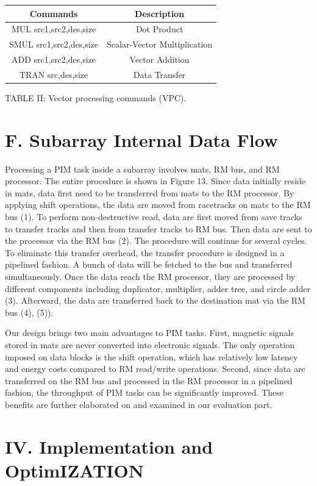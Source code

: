 \documentclass[10pt]{article}
\begin{document}
\begin{center}
\begin{tabular}{|c|c|}
\hline
Commands & Description \\
\hline
MUL src1,src2,des,size & Dot Product \\
\hline
SMUL src1,src2,des,size & Scalar-Vector Multiplication \\
\hline
ADD src1,src2,des,size & Vector Addition \\
\hline
TRAN src,des,size & Data Transfer \\
\hline
\end{tabular}
\end{center}

TABLE II: Vector processing commands (VPC).

\section*{F. Subarray Internal Data Flow}
Processing a PIM task inside a subarray involves mats, RM bus, and RM processor. The entire procedure is shown in Figure 13. Since data initially reside in mats, data first need to be transferred from mats to the RM processor. By applying shift operations, the data are moved from racetracks on mats to the RM bus (1). To perform non-destructive read, data are first moved from save tracks to transfer tracks and then from transfer tracks to RM bus. Then data are sent to the processor via the RM bus (2). The procedure will continue for several cycles. To eliminate this transfer overhead, the transfer procedure is designed in a pipelined fashion. A bunch of data will be fetched to the bus and transferred simultaneously. Once the data reach the RM processor, they are processed by different components including duplicator, multiplier, adder tree, and circle adder (3). Afterward, the data are transferred back to the destination mat via the RM bus (4), (5)).

Our design brings two main advantages to PIM tasks. First, magnetic signals stored in mats are never converted into electronic signals. The only operation imposed on data blocks is the shift operation, which has relatively low latency and energy costs compared to RM read/write operations. Second, since data are transferred on the RM bus and processed in the RM processor in a pipelined fashion, the throughput of PIM tasks can be significantly improved. These benefits are further elaborated on and examined in our evaluation part.

\section*{IV. Implementation and OptimIZATION}
\end{document}
